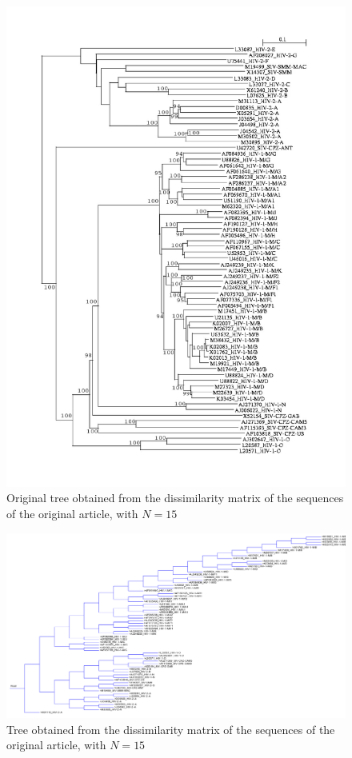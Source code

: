 \documentclass[english,13pt,a4paper]{article}
\theoremstyle{definition}
\theoremstyle{remark}
\theoremstyle{defstyle}
\begin{document}
\begin{figure}[H]
    \centering
    \includegraphics[width=\textwidth]{../Trees/original_66_tree.png}
    \caption{Original tree obtained from the dissimilarity matrix of the sequences of the original article, with $N = 15$}
    \label{fig:original_tree66}
\end{figure}

\begin{figure}[H]
    \centering
    \includegraphics[width=.95\textheight, angle=90]{../Trees/66_tree.png}
    \caption{Tree obtained from the dissimilarity matrix of the sequences of the original article, with $N = 15$}
    \label{fig:tree66}
\end{figure}
\end{document}
